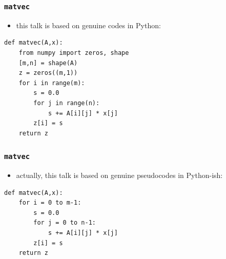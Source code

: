 \documentclass[10pt,
               svgnames,
               hyperref={colorlinks,citecolor=DeepPink4,linkcolor=FireBrick,urlcolor=Maroon},
               usepdftitle=false]{beamer}
\begin{document}
\begin{frame}[fragile]
\frametitle{\texttt{matvec}}
\begin{itemize}
\item \phantom{actually,} this talk is based on genuine \phantom{pseudo}codes in Python\phantom{-ish}:
\end{itemize}
\begin{center}
\begin{minipage}{0.7\textwidth}
\begin{verbatim}
def matvec(A,x):
    from numpy import zeros, shape
    [m,n] = shape(A)
    z = zeros((m,1))
    for i in range(m):
        s = 0.0
        for j in range(n):
            s += A[i][j] * x[j]
        z[i] = s
    return z
\end{verbatim}
\end{minipage}
\end{center}
\end{frame}

\begin{frame}[fragile]
\frametitle{\texttt{matvec}}
\begin{itemize}
\item actually, this talk is based on genuine pseudocodes in Python-ish:
\end{itemize}
\begin{center}
\begin{minipage}{0.7\textwidth}
\begin{verbatim}
def matvec(A,x):
    for i = 0 to m-1:
        s = 0.0
        for j = 0 to n-1:
            s += A[i][j] * x[j]
        z[i] = s
    return z



\end{verbatim}
\end{minipage}
\end{center}
\end{frame}
\end{document}

